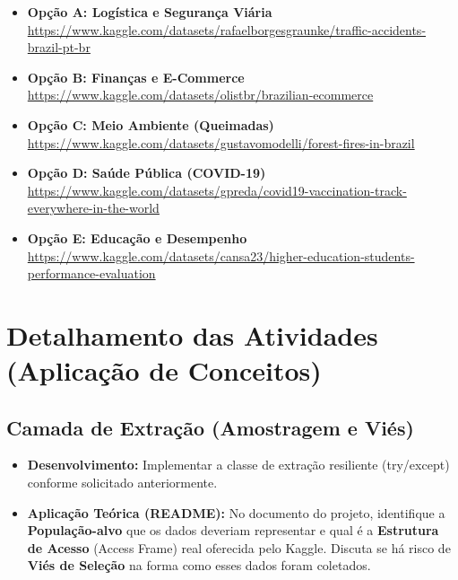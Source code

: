\documentclass[12pt,a4paper]{article}
\begin{document}
	\begin{itemize}[leftmargin=*]
		\item \textbf{Opção A: Logística e Segurança Viária} \\
		{\footnotesize \url{https://www.kaggle.com/datasets/rafaelborgesgraunke/traffic-accidents-brazil-pt-br}}
		
		\item \textbf{Opção B: Finanças e E-Commerce} \\
		{\footnotesize \url{https://www.kaggle.com/datasets/olistbr/brazilian-ecommerce}}
		
		\item \textbf{Opção C: Meio Ambiente (Queimadas)} \\
		{\footnotesize \url{https://www.kaggle.com/datasets/gustavomodelli/forest-fires-in-brazil}}
		
		\item \textbf{Opção D: Saúde Pública (COVID-19)} \\
		{\footnotesize \url{https://www.kaggle.com/datasets/gpreda/covid19-vaccination-track-everywhere-in-the-world}}
		
		\item \textbf{Opção E: Educação e Desempenho} \\
		{\footnotesize \url{https://www.kaggle.com/datasets/cansa23/higher-education-students-performance-evaluation}}
	\end{itemize}

	\section{Detalhamento das Atividades (Aplicação de Conceitos)}

	\subsection{Camada de Extração (Amostragem e Viés)}
	\begin{itemize}
		\item \textbf{Desenvolvimento:} Implementar a classe de extração resiliente (try/except) conforme solicitado anteriormente.
		\item \textbf{Aplicação Teórica (README):} No documento do projeto, identifique a \textbf{População-alvo} que os dados deveriam representar e qual é a \textbf{Estrutura de Acesso} (Access Frame) real oferecida pelo Kaggle. Discuta se há risco de \textbf{Viés de Seleção} na forma como esses dados foram coletados.
	\end{itemize}
\end{document}
